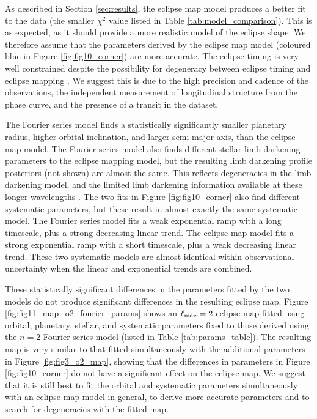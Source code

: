 \documentclass[twocolumn]{aastex631}
\begin{document}
As described in Section \ref{sec:results}, the eclipse map model produces a better fit to the data (the smaller $\chi^{2}$ value listed in Table \ref{tab:model_comparison}). This is as expected, as it should provide a more realistic model of the eclipse shape. We therefore assume that the parameters derived by the eclipse map model (coloured blue in Figure \ref{fig:fig10_corner}) are more accurate. The eclipse timing is very well constrained despite the possibility for degeneracy between eclipse timing and eclipse mapping \citep{williams2006resolving}. We suggest this is due to the high precision and cadence of the observations, the independent measurement of longitudinal structure from the phase curve, and the presence of a transit in the dataset.

The Fourier series model finds a statistically significantly smaller planetary radius, higher orbital inclination, and larger semi-major axis, than the eclipse map model. The Fourier series model also finds different stellar limb darkening parameters to the eclipse mapping model, but the resulting limb darkening profile posteriors (not shown) are almost the same. This reflects degeneracies in the limb darkening model, and the limited limb darkening information available at these longer wavelengths \citep{morello2017,morello2018}. The two fits in Figure \ref{fig:fig10_corner} also find different systematic parameters, but these result in almost exactly the same systematic model. The Fourier series model fits a weak exponential ramp with a long timescale, plus a strong decreasing linear trend. The eclipse map model fits a strong exponential ramp with a short timescale, plus a weak decreasing linear trend. These two systematic models are almost identical within observational uncertainty when the linear and exponential trends are combined.

These statistically significant differences in the parameters fitted by the two models do not produce significant differences in the resulting eclipse map. Figure \ref{fig:fig11_map_o2_fourier_params} shows an $\ell_{\rm max}=2$ eclipse map fitted using orbital, planetary, stellar, and systematic parameters fixed to those derived using the $n=2$ Fourier series model (listed in Table \ref{tab:params_table}). The resulting map is very similar to that fitted simultaneously with the additional parameters in Figure \ref{fig:fig3_o2_map}, showing that the differences in parameters in Figure \ref{fig:fig10_corner} do not have a significant effect on the eclipse map. We suggest that it is still best to fit the orbital and systematic parameters simultaneously with an eclipse map model in general, to derive more accurate parameters and to search for degeneracies with the fitted map.
\end{document}
